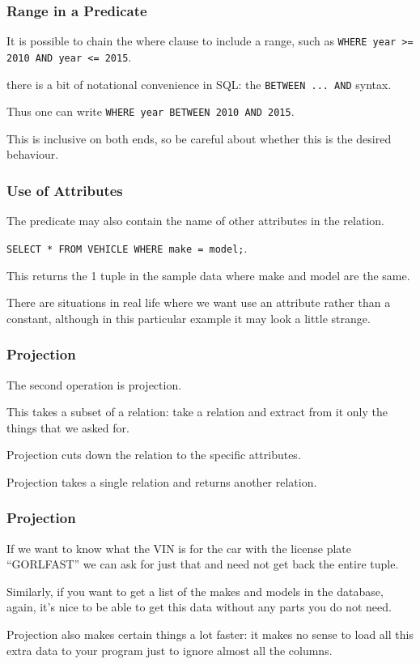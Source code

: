 \begin{frame}
\frametitle{Range in a Predicate}

It is possible to chain the where clause to include a range, such as \texttt{WHERE year >= 2010 AND year <= 2015}.

there is a bit of notational convenience in SQL: the \texttt{BETWEEN ... AND} syntax. 

Thus one can write \texttt{WHERE year BETWEEN 2010 AND 2015}. 

This is inclusive on both ends, so be careful about whether this is the desired behaviour. 

\end{frame}



\begin{frame}
\frametitle{Use of Attributes}

The predicate may also contain the name of other attributes in the relation.

\texttt{SELECT * FROM VEHICLE WHERE make = model;}. 

This returns the 1 tuple in the sample data where make and model are the same. 

There are situations in real life where we want use an attribute rather than a constant, although in this particular example it may look a little strange.

\end{frame}



\begin{frame}
\frametitle{Projection}

The second operation is \alert{projection}. 

This takes a subset of a relation: take a relation and extract from it only the things that we asked for. 

Projection cuts down the relation to the specific attributes. 

Projection takes a single relation and returns another relation.


\end{frame}



\begin{frame}
\frametitle{Projection}

If we want to know what the VIN is for the car with the license plate ``GORLFAST'' we can ask for just that and need not get back the entire tuple. 

Similarly, if you want to get a list of the makes and models in the database, again, it's nice to be able to get this data without any parts you do not need. 

Projection also makes certain things a lot faster: it makes no sense to load all this extra data to your program just to ignore almost all the columns.

\end{frame}



